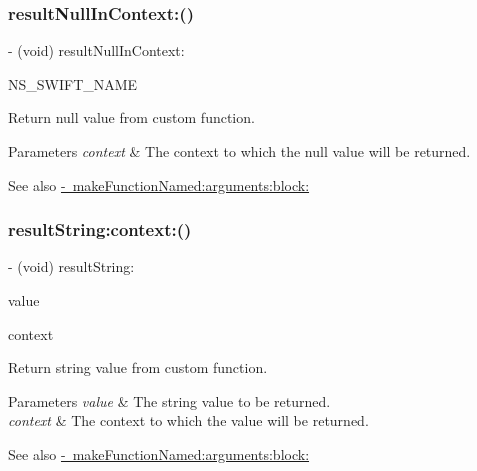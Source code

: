 \subsubsection{\texorpdfstring{result\+Null\+In\+Context\+:()}{resultNullInContext:()}}
{\footnotesize\ttfamily -\/ (void) result\+Null\+In\+Context\+: \begin{DoxyParamCaption}\item[{(result\+Null(context\+:))}]{N\+S\+\_\+\+S\+W\+I\+F\+T\+\_\+\+N\+A\+ME }\end{DoxyParamCaption}}

Return null value from custom function.


\begin{DoxyParams}{Parameters}
{\em context} & The context to which the null value will be returned.\\
\hline
\end{DoxyParams}
\begin{DoxySeeAlso}{See also}
\mbox{\hyperlink{interface_o_p_t_l_y_f_m_d_b_database_af2c3e10041c8d0a95e2feb84a2ffa645}{-\/ make\+Function\+Named\+:arguments\+:block\+:}} 
\end{DoxySeeAlso}
\mbox{\label{interface_o_p_t_l_y_f_m_d_b_database_ac7c27744e97581b6cc0f50ba72c5874c}} 
\subsubsection{\texorpdfstring{result\+String\+:context\+:()}{resultString:context:()}}
{\footnotesize\ttfamily -\/ (void) result\+String\+: \begin{DoxyParamCaption}\item[{(N\+S\+String $\ast$)}]{value }\item[{context:(void $\ast$)}]{context }\end{DoxyParamCaption}}

Return string value from custom function.


\begin{DoxyParams}{Parameters}
{\em value} & The string value to be returned. \\
\hline
{\em context} & The context to which the value will be returned.\\
\hline
\end{DoxyParams}
\begin{DoxySeeAlso}{See also}
\mbox{\hyperlink{interface_o_p_t_l_y_f_m_d_b_database_af2c3e10041c8d0a95e2feb84a2ffa645}{-\/ make\+Function\+Named\+:arguments\+:block\+:}} 
\end{DoxySeeAlso}
\mbox{\label{interface_o_p_t_l_y_f_m_d_b_database_a511569a0ee0c82136255920ebe9d28e6}} 
